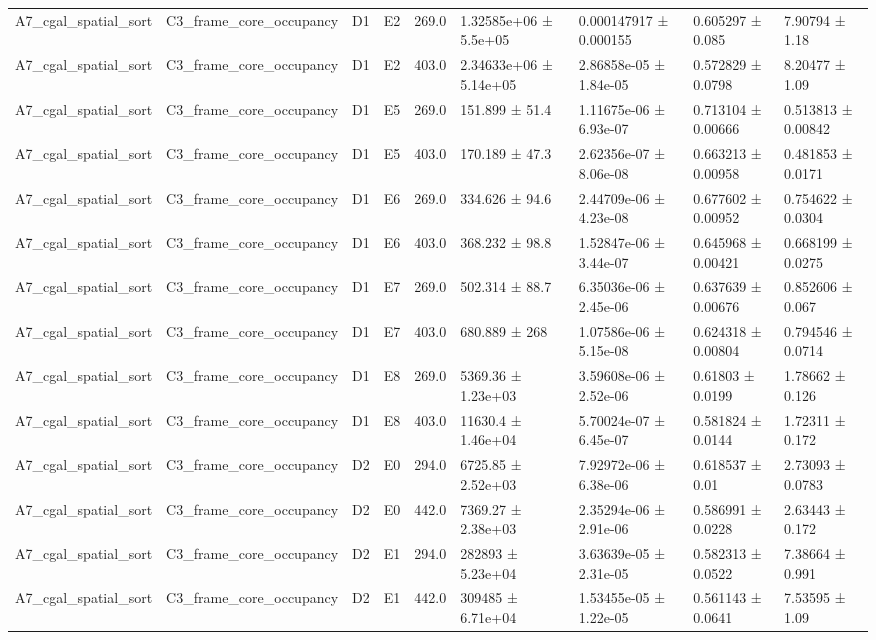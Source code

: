 \begin{table}
\begin{tabular}{lllllllll}
A7\_cgal\_spatial\_sort & C3\_frame\_core\_occupancy & D1 & E2 & 269.0 & 1.32585e+06 ± 5.5e+05 & 0.000147917 ± 0.000155 & 0.605297 ± 0.085 & 7.90794 ± 1.18 \\
A7\_cgal\_spatial\_sort & C3\_frame\_core\_occupancy & D1 & E2 & 403.0 & 2.34633e+06 ± 5.14e+05 & 2.86858e-05 ± 1.84e-05 & 0.572829 ± 0.0798 & 8.20477 ± 1.09 \\
A7\_cgal\_spatial\_sort & C3\_frame\_core\_occupancy & D1 & E5 & 269.0 & 151.899 ± 51.4 & 1.11675e-06 ± 6.93e-07 & 0.713104 ± 0.00666 & 0.513813 ± 0.00842 \\
A7\_cgal\_spatial\_sort & C3\_frame\_core\_occupancy & D1 & E5 & 403.0 & 170.189 ± 47.3 & 2.62356e-07 ± 8.06e-08 & 0.663213 ± 0.00958 & 0.481853 ± 0.0171 \\
A7\_cgal\_spatial\_sort & C3\_frame\_core\_occupancy & D1 & E6 & 269.0 & 334.626 ± 94.6 & 2.44709e-06 ± 4.23e-08 & 0.677602 ± 0.00952 & 0.754622 ± 0.0304 \\
A7\_cgal\_spatial\_sort & C3\_frame\_core\_occupancy & D1 & E6 & 403.0 & 368.232 ± 98.8 & 1.52847e-06 ± 3.44e-07 & 0.645968 ± 0.00421 & 0.668199 ± 0.0275 \\
A7\_cgal\_spatial\_sort & C3\_frame\_core\_occupancy & D1 & E7 & 269.0 & 502.314 ± 88.7 & 6.35036e-06 ± 2.45e-06 & 0.637639 ± 0.00676 & 0.852606 ± 0.067 \\
A7\_cgal\_spatial\_sort & C3\_frame\_core\_occupancy & D1 & E7 & 403.0 & 680.889 ± 268 & 1.07586e-06 ± 5.15e-08 & 0.624318 ± 0.00804 & 0.794546 ± 0.0714 \\
A7\_cgal\_spatial\_sort & C3\_frame\_core\_occupancy & D1 & E8 & 269.0 & 5369.36 ± 1.23e+03 & 3.59608e-06 ± 2.52e-06 & 0.61803 ± 0.0199 & 1.78662 ± 0.126 \\
A7\_cgal\_spatial\_sort & C3\_frame\_core\_occupancy & D1 & E8 & 403.0 & 11630.4 ± 1.46e+04 & 5.70024e-07 ± 6.45e-07 & 0.581824 ± 0.0144 & 1.72311 ± 0.172 \\
A7\_cgal\_spatial\_sort & C3\_frame\_core\_occupancy & D2 & E0 & 294.0 & 6725.85 ± 2.52e+03 & 7.92972e-06 ± 6.38e-06 & 0.618537 ± 0.01 & 2.73093 ± 0.0783 \\
A7\_cgal\_spatial\_sort & C3\_frame\_core\_occupancy & D2 & E0 & 442.0 & 7369.27 ± 2.38e+03 & 2.35294e-06 ± 2.91e-06 & 0.586991 ± 0.0228 & 2.63443 ± 0.172 \\
A7\_cgal\_spatial\_sort & C3\_frame\_core\_occupancy & D2 & E1 & 294.0 & 282893 ± 5.23e+04 & 3.63639e-05 ± 2.31e-05 & 0.582313 ± 0.0522 & 7.38664 ± 0.991 \\
A7\_cgal\_spatial\_sort & C3\_frame\_core\_occupancy & D2 & E1 & 442.0 & 309485 ± 6.71e+04 & 1.53455e-05 ± 1.22e-05 & 0.561143 ± 0.0641 & 7.53595 ± 1.09 \\

\end{tabular}
\end{table}
